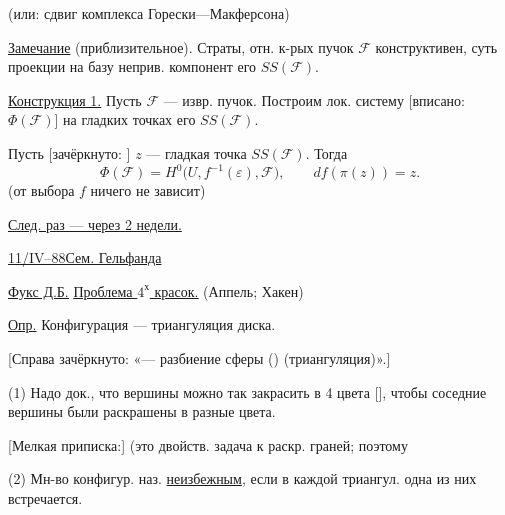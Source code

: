 (или: сдвиг комплекса Горески—Макферсона)

\underline{Замечание} (приблизительное).
Страты, отн. к-рых пучок $\mathcal{F}$ конструктивен,
суть проекции на базу неприв. компонент его $SS(\mathcal{F})$.

\underline{Конструкция 1.}
Пусть $\mathcal{F}$ — извр. пучок.
Построим лок. систему [вписано: $\Phi(\mathcal{F})$]
на гладких точках его $SS(\mathcal{F})$.

Пусть [зачёркнуто: ]
$z$ — гладкая точка $SS(\mathcal{F})$.
Тогда
\begin{equation*}
\Phi(\mathcal{F})=
H^{0}\bigl(U,f^{-1}(\varepsilon),\mathcal{F}\bigr),
\qquad df(\pi(z))=z. \tag{11}
\end{equation*}
(от выбора $f$ ничего не зависит)

\underline{След. раз — через 2 недели.}




\underline{11/IV--88}\quad \underline{Сем. Гельфанда}

\underline{\underline{Фукс Д.Б.}}\quad
\underline{\underline{Проблема $4^{\text{х}}$ красок.}}\quad
(Аппель; Хакен)

\underline{Опр.} Конфигурация — триангуляция диска.

[Справа зачёркнуто: «— разбиение сферы ()
(триангуляция)».]




(1) Надо док., что вершины можно так закрасить в 4 цвета
[],
чтобы соседние вершины были раскрашены в разные цвета.

[Мелкая приписка:] (это двойств. задача к раскр. граней; поэтому

(2) Мн-во конфигур. наз. \underline{неизбежным}, если в каждой триангул.
одна из них встречается.

